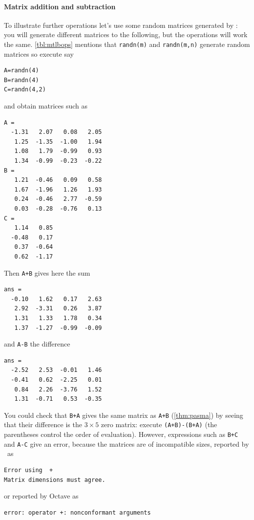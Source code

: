 \paragraph{Matrix addition and subtraction}
To illustrate further operations let's use some random matrices generated by \script: you will generate different matrices to the following, but the operations will work the same.
\autoref{tbl:mtlbops} mentions that \verb|randn(m)| and \verb|randn(m,n)| generate random matrices so execute say
\begin{verbatim}
A=randn(4)
B=randn(4)
C=randn(4,2)
\end{verbatim}
and obtain matrices such as \twodp
\setbox\ajrqrbox\hbox{}%
\marginpar{\usebox{\ajrqrbox\\[2ex]}}%
\begin{verbatim}
A =
  -1.31   2.07   0.08   2.05
   1.25  -1.35  -1.00   1.94
   1.08   1.79  -0.99   0.93
   1.34  -0.99  -0.23  -0.22
B =
   1.21  -0.46   0.09   0.58
   1.67  -1.96   1.26   1.93
   0.24  -0.46   2.77  -0.59
   0.03  -0.28  -0.76   0.13
C =
   1.14   0.85
  -0.48   0.17
   0.37  -0.64
   0.62  -1.17
\end{verbatim}
Then \verb|A+B| gives here the sum
\begin{verbatim}
ans =
  -0.10   1.62   0.17   2.63
   2.92  -3.31   0.26   3.87
   1.31   1.33   1.78   0.34
   1.37  -1.27  -0.99  -0.09
\end{verbatim}
and \verb|A-B| the difference
\begin{verbatim}
ans =
  -2.52   2.53  -0.01   1.46
  -0.41   0.62  -2.25   0.01
   0.84   2.26  -3.76   1.52
   1.31  -0.71   0.53  -0.35
\end{verbatim}
You could check that \verb|B+A| gives the same matrix as \verb|A+B| (\autoref{thm:pasma}) by seeing that their difference is the \(3\times5\) zero matrix: execute \verb|(A+B)-(B+A)| (the parentheses control the order of evaluation).
However, expressions such as \verb|B+C| and \verb|A-C| give an error, because the matrices are of incompatible sizes, reported by \script[1]\ as%
%
%
\begin{verbatim}
Error using  + 
Matrix dimensions must agree. 
\end{verbatim}
or reported by Octave as
\begin{verbatim}
error: operator +: nonconformant arguments 
\end{verbatim}


